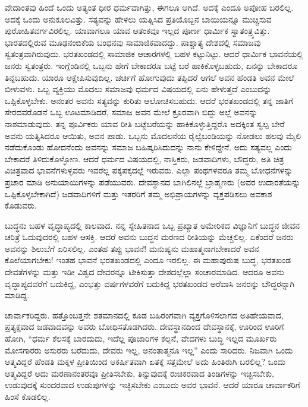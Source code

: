 ವೇದಾಂತವು ಹಿಂದೆ ಒಂದು ಅತ್ಯಂತ ಧೀರ ಧರ್ಮವಾಗಿತ್ತು, ಈಗಲೂ ಆಗಿದೆ. ಅದಕ್ಕೆ ಎಂದೂ ಅಪೋಹ ಬರಲಿಲ್ಲ. ಅದಕ್ಕೆ ಒಂದು ಅನುಕೂಲವಿತ್ತು. ಸತ್ಯವನ್ನು ಹೇಳಲು ಯತ್ನಿಸಿದ ಪ್ರತಿಯೊಬ್ಬನ ಬಾಯಿಯನ್ನೂ ಮುಚ್ಚಿಸುವ ಪುರೋಹಿತವರ್ಗವಿರಲಿಲ್ಲ. ಯಾವಾಗಲೂ ಯಾವ ಆತಂಕವೂ ಇಲ್ಲದ ಪೂರ್ಣ ಧಾರ್ಮಿಕ ಸ್ವಾತಂತ್ರ್ಯವಿತ್ತು. ಭಾರತದಲ್ಲಿರುವ ಮೂಢನಂಬಿಕೆಯ ಬಂಧನವು ಸಾಮಾಜಿಕವಾದದ್ದು. ಪಾಶ್ಚಾತ್ಯ ದೇಶದಲ್ಲಿ ಸಮಾಜವು ಸ್ವತಂತ್ರವಾಗಿರುವುದು. ಭರತಖಂಡದಲ್ಲಿ ಸಾಮಾಜಿಕ ಆಚಾರಗಳಲ್ಲಿ ಬಹಳ ಕಟ್ಟುನಿಟ್ಟು. ಆದರೆ ಧಾರ್ಮಿಕ ಭಾವನೆಯಲ್ಲಿ ಜನರು ಸ್ವತಂತ್ರರು. ಇಂಗ್ಲೆಂಡಿನಲ್ಲಿ ಒಬ್ಬನು ಹೇಗೆ ಬೇಕಾದರೂ ಬಟ್ಟೆ ಬರೆ ಹಾಕಿಕೊಳ್ಳಬಹುದು, ಏನನ್ನು ಬೇಕಾದರೂ ತಿನ್ನಬಹುದು. ಯಾರೂ ಆಕ್ಷೇಪಿಸುವುದಿಲ್ಲ. ಚರ್ಚಿಗೆ ಹೋಗುವುದು ತಪ್ಪಿದರೆ ಆಗಲೆ ಅವನ ಹೆಂಡತಿ ಅವನ ಮೇಲೆ ಬೀಳುವಳು. ಒಬ್ಬ ವ್ಯಕ್ತಿಯು ಮೊದಲು ಸಮಾಜವು ಧರ್ಮದ ವಿಷಯದಲ್ಲಿ ಏನು ಹೇಳುತ್ತದೆ ಎಂಬುದನ್ನು ಒಪ್ಪಿಕೊಳ್ಳಬೇಕು. ಅನಂತರ ಅವನು ಸತ್ಯವನ್ನು ಕುರಿತು ಆಲೋಚಿಸಬಹುದು. ಆದರೆ ಭರತಖಂಡದಲ್ಲಿ ತನ್ನ ಜಾತಿಗೆ ಸೇರದವರೊಡನೆ ಒಬ್ಬ ಊಟಮಾಡಿದರೆ, ಸಮಾಜ ಅವನ ಮೇಲೆ ಕ್ರೂರವಾಗಿ ಬಿದ್ದು ಅಲ್ಲೆ ಅವನನ್ನು ನಾಶಮಾಡುವುದು. ತನ್ನ ಪೂರ್ವಿಕರು ಯಾವ ರೀತಿ ಬಟ್ಟೆಬರೆಯನ್ನು ಹಾಕಿಕೊಳ್ಳುತ್ತಿದ್ದರೊ ಅದಕ್ಕಿಂತ ಸ್ವಲ್ಪ ಬೇರೆ ಅವನು ಯತ್ನಿಸಿದರೂ ಆಯಿತು, ಅವನ ಪಾಡು. ಒಬ್ಬನು ಮೊದಲನೆಯ ರೈಲ್ವೆಬಂಡಿಯನ್ನು ನೋಡಲು ಹಲವು ಮೈಲಿ ನಡೆದುಕೊಂಡು ಹೋದನೆಂದು ಅವನನ್ನು ಸಮಾಜ ಬಹಿಷ್ಕರಿಸಿದುದನ್ನು ನಾನು ಕೇಳಿದ್ದೇನೆ. ಅದು ಸತ್ಯವಲ್ಲ ಎಂದು ಬೇಕಾದರೆ ತಿಳಿದುಕೊಳ್ಳೋಣ. ಆದರೆ ಧರ್ಮದ ವಿಷಯದಲ್ಲಿ, ನಾಸ್ತಿಕರು, ಜಡವಾದಿಗಳು, ಬೌದ್ಧರು, ಅತಿ ಚಿತ್ರ ವಿಚಿತ್ರವಾದ ಭಾವನೆಗಳುಳ್ಳವರು ಇವರೆಲ್ಲ ಪಕ್ಕಪಕ್ಕದಲ್ಲೆ ಇರುವರು. ಎಲ್ಲಾ ಪಂಥಗಳವರೂ ತಮ್ಮ ಬೋಧನೆಗಳನ್ನು ಪ್ರಚಾರ ಮಾಡಿ ಅನುಯಾಯಿಗಳನ್ನು ಪಡೆಯುವರು. ದೇವಸ್ಥಾನದ ಬಾಗಿಲಿನಲ್ಲೆ ಬ್ರಾಹ್ಮಣರು (ಅವರ ಉದಾರತೆಯನ್ನು ಒಪ್ಪಿಕೊಳ್ಳಬೇಕಾಗಿದೆ) ಜಡವಾದಿಗಳಿಗೆ ಮತ್ತು ಇತರರಿಗೆ ತಮ್ಮ ಅಭಿಪ್ರಾಯಗಳನ್ನು ವ್ಯಕ್ತಪಡಿಸಲು ಅವಕಾಶ ಕೊಡುವರು.

ಬುದ್ಧನು ಬಹಳ ವೃದ್ಧಾಪ್ಯದಲ್ಲಿ ಕಾಲವಾದ. ನನ್ನ ಸ್ನೇಹಿತನಾದ ಒಬ್ಬ ಪ್ರಖ್ಯಾತ ಅಮೇರಿಕದ ವಿಜ್ಞಾನಿಗೆ ಬುದ್ಧನ ಜೀವನ ಚರಿತ್ರೆ ಓದುವುದರಲ್ಲಿ ಬಹಳ ಆಸಕ್ತಿ. ಆದರೆ ಅವನು ಬುದ್ಧನ ಮರಣದ ರೀತಿಯನ್ನು ಮೆಚ್ಚಲಿಲ್ಲ. ಏಕೆಂದರೆ ಜನರು ಅವನನ್ನು ಶಿಲುಬೆಗೆ ಏರಿಸಲಿಲ್ಲ. ಎಂತಹ ತಪ್ಪು ಭಾವನೆ! ಮನುಷ್ಯನು ಮಹಾತ್ಮನಾಗಬೇಕಾದರೆ ಅವನ ಕೊಲೆಯಾಗಬೇಕು! ಇಂತಹ ಭಾವನೆ ಭರತಖಂಡದಲ್ಲಿ ಎಂದೂ ಇರಲಿಲ್ಲ. ಈ ಮಹಾಪುರುಷ ಬುದ್ಧ, ಭರತಖಂಡ ದೇವತೆಗಳನ್ನು ಮತ್ತು ಇಡೀ ವಿಶ್ವದ ದೇವರನ್ನೂ ಟೀಕಿಸುತ್ತಾ ದೇಶದಲ್ಲೆಲ್ಲಾ ಸಂಚಾರಮಾಡಿದ. ಆದರೂ ಅವನು ವೃದ್ಧಾಪ್ಯದವರೆಗೆ ಬದುಕಿದ್ದ, ಎಂಭತ್ತು ವರ್ಷಗಳವರೆಗೆ ಬದುಕಿದ್ದ ಭರತಖಂಡದ ಅರೆವಾಸಿ ಜನರನ್ನು ಬೌದ್ಧರನ್ನಾಗಿ ಮಾಡಿದ್ದ.

ಚಾರ್ವಾಕರಿದ್ದರು. ಹತ್ತೊಂಬತ್ತನೇ ಶತಮಾನದಲ್ಲಿ ಕೂಡ ಬಹಿರಂಗವಾಗಿ ವ್ಯಕ್ತಗೊಳಿಸಲಾಗದ ಅತಿಹೇಯವಾದ, ಪ್ರತ್ಯಕ್ಷವಾದ ಜಡವಾದವನ್ನು ಅವರು ಬೋಧಿಸತೊಡಗಿದರು. ದೇವಸ್ಥಾನದಿಂದ ದೇವಸ್ಥಾನಕ್ಕೆ, ಊರಿಂದ ಊರಿಗೆ ಹೋಗಿ, “ಧರ್ಮ ಕೆಲಸಕ್ಕೆ ಬಾರದುದು, ಇದೆಲ್ಲ ಪೂಜಾರಿಗಳ ಕಲ್ಪನೆ, ವೇದಗಳು ಬುದ್ಧಿ ಇಲ್ಲದ ಮೂರ್ಖರು ಮೋಸಗಾರರು ಅಸುರರು ಬರೆದುದು, ದೇವರು ಇಲ್ಲ, ಅನಂತಾತ್ಮನೂ ಇಲ್ಲ” ಎಂದು ಸಾರಿದರು. ನಿಜವಾಗಿ ಒಂದು ಆತ್ಮವಿದ್ದರೆ ಹೆಂಡತಿ ಮಕ್ಕಳ ಪ್ರೀತಿಯಿಂದ ಆಕರ್ಷಿತವಾಗಿ ಏತಕ್ಕೆ ಸತ್ತಮೇಲೆ ಅದು ಹಿಂತಿರುಗಿ ಬರಲಿಲ್ಲ? ಒಂದು ಆತ್ಮವಿದ್ದರೆ ಅದು ಮರಣಾನಂತರವೂ ಪ್ರೀತಿಸಬೇಕು, ತಿನ್ನುವುದಕ್ಕೆ ರುಚಿಕರವಾದ ತಿಂಡಿಗಳನ್ನು ಇಚ್ಛಿಸಬೇಕು, ಉಡುವುದಕ್ಕೆ ಸುಂದರವಾದ ಉಡುಪುಗಳನ್ನು ಇಚ್ಛಿಸಬೇಕು ಎಂಬುದು ಅವರ ಭಾವನೆ. ಆದರೆ ಯಾರೂ ಚಾರ್ವಾಕರಿಗೆ ಹಿಂಸೆ ಕೊಡಲಿಲ್ಲ.

